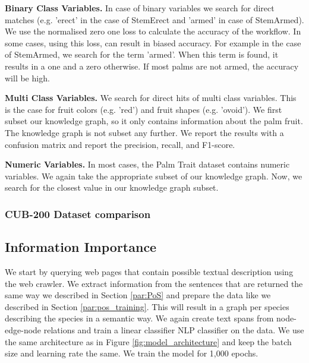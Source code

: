\documentclass[a4paper, 12pt, oneside]{book} %
\begin{document}
\noindent
\textbf{Binary Class Variables.}
In case of binary variables we search for direct matches (e.g. 'erect' in the case of StemErect and 'armed' in case of StemArmed).
We use the normalised zero one loss \autocite{sammut_zero-one_2010} to calculate the accuracy of the workflow.
In some cases, using this loss, can result in biased accuracy.
For example in the case of StemArmed, we search for the term 'armed'. When this term is found, it results in a one and a zero otherwise. 
If most palms are not armed, the accuracy will be high.
\newline

\noindent
\textbf{Multi Class Variables.}
We search for direct hits of multi class variables.
This is the case for fruit colors (e.g. 'red') and fruit shapes (e.g. 'ovoid').
We first subset our knowledge graph, so it only contains information about the palm fruit. 
The knowledge graph is not subset any further.
We report the results with a confusion matrix and report the precision, recall, and F1-score.
\newline

\noindent
\textbf{Numeric Variables.}
In most cases, the Palm Trait dataset contains numeric variables.
We again take the appropriate subset of our knowledge graph.
Now, we search for the closest value in our knowledge graph subset.

\subsubsection{CUB-200 Dataset comparison}



\subsection{Information Importance}
We start by querying web pages that contain possible textual description using the web crawler.
We extract information from the sentences that are returned the same way we described in Section \ref{par:PoS} and prepare the data like we described in Section \ref{par:pos_training}.
This will result in a graph per species describing the species in a semantic way.
We again create text spans from node-edge-node relations and train a linear classifier NLP classifier on the data.
We use the same architecture as in Figure \ref{fig:model_architecture} and keep the batch size and learning rate the same.
We train the model for 1,000 epochs.
\end{document}
